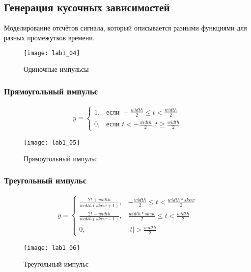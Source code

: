 \subsection{Генерация кусочных зависимостей}
Моделирование отсчётов сигнала, который описывается разными функциями для разных 
промежутков времени.

\begin{figure}[H]
	\begin{center}
		\texttt{[image: lab1\_04]}
		\caption{Одиночные импульсы} 
		\label{pic:lab1_04} %
	\end{center}
\end{figure}


\subsubsection{Прямоугольный импульс}
\begin{eqnarray}
y =
\begin{cases}
1, & \text{если } -\frac{width}{2} \leq t < \frac{width}{2}\\
0, & \text{если } t<-\frac{width}{2} , t \geq \frac{width}{2}
\end{cases}
\end{eqnarray}

\begin{figure}[H]
	\begin{center}
		\texttt{[image: lab1\_05]}
		\caption{Прямоугольный импульс} 
		\label{pic:lab1_05} %
	\end{center}
\end{figure}
\subsubsection{Треугольный импульс}
\begin{eqnarray}
y =
\begin{cases}
\frac{2t+width}{width(skew+1)}, & -\frac{width}{2}\leq t < \frac{width*skew}{2}\\
\frac{2t-width}{width(skew-1)}, &  \frac{width*skew}{2}\leq t < \frac{width}{2}\\
0, & |t| > \frac{width}{2}
\end{cases}
\end{eqnarray}
\begin{figure}[H]
	\begin{center}
		\texttt{[image: lab1\_06]}
		\caption{Треугольный импульс} 
		\label{pic:lab1_06} %
	\end{center}
\end{figure}
